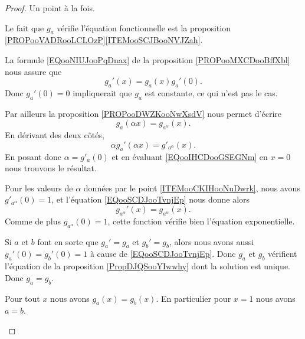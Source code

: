 \begin{proof}
	Un point à la fois.
	\begin{subproof}
		Le fait que \( g_a\) vérifie l'équation fonctionnelle est la proposition \ref{PROPooVADRooLCLOzP}\ref{ITEMooSCJBooNVJZah}.


		La formule \eqref{EQooNIUJooPqDnax} de la proposition \ref{PROPooMXCDooBffXbl} nous assure que
		\begin{equation}        \label{EQooSCDJooTvnjEp}
			g_a'(x)=g_a(x)g_a'(0).
		\end{equation}
		Donc \( g_a'(0)=0\) impliquerait que \( g_a\) est constante, ce qui n'est pas le cas.

		Par ailleurs la proposition \ref{PROPooDWZKooNwXsdV} nous permet d'écrire
		\begin{equation}
			g_a(\alpha x)=g_{a^{\alpha}}(x).
		\end{equation}
		En dérivant des deux côtés,
		\begin{equation}        \label{EQooIHCDooGSEGNm}
			\alpha g_a'(\alpha x)=g'_{a^{\alpha}}(x).
		\end{equation}
		En posant donc \( \alpha=g'_a(0)\) et en évaluant \eqref{EQooIHCDooGSEGNm} en \( x=0\) nous trouvons le résultat.


		Pour les valeurs de \( \alpha\) données par le point \ref{ITEMooCKIHooNuDwrk}, nous avons \( g'_{a^{\alpha}}(0)=1\), et l'équation \eqref{EQooSCDJooTvnjEp} nous donne alors
		\begin{equation}
			g_{a^{\alpha}}'(x)=g_{a^{\alpha}}(x).
		\end{equation}
		Comme de plus \( g_{a^{\alpha}}(0)=1\), cette fonction vérifie bien l'équation exponentielle.

		Si \( a\) et \( b\) font en sorte que \( g_a'=g_a\) et \( g_b'=g_b\), alors nous avons aussi \( g_a'(0)=g_b'(0)=1\) à cause de \eqref{EQooSCDJooTvnjEp}. Donc \( g_a\) et \( g_b\) vérifient l'équation de la proposition \ref{PropDJQSooYIwwhy} dont la solution est unique. Donc \( g_a=g_b\).

		Pour tout \( x\) nous avons \( g_a(x)=g_b(x)\). En particulier pour \( x=1\) nous avons \( a=b\).
	\end{subproof}
\end{proof}

